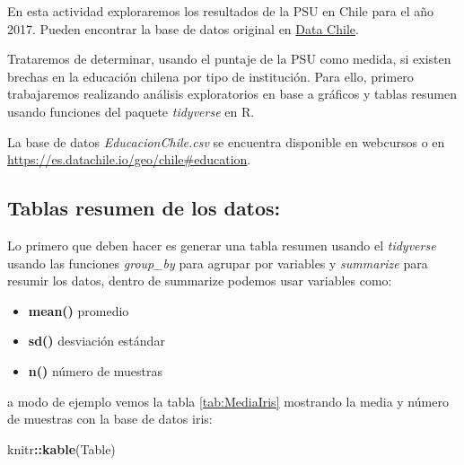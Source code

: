 \documentclass[]{book}
\newenvironment{Shaded}{\begin{snugshade}}{\end{snugshade}}
\newcommand{\KeywordTok}[1]{\textcolor[rgb]{0.13,0.29,0.53}{\textbf{#1}}}
\newcommand{\DataTypeTok}[1]{\textcolor[rgb]{0.13,0.29,0.53}{#1}}
\newcommand{\StringTok}[1]{\textcolor[rgb]{0.31,0.60,0.02}{#1}}
\newcommand{\OperatorTok}[1]{\textcolor[rgb]{0.81,0.36,0.00}{\textbf{#1}}}
\newcommand{\NormalTok}[1]{#1}
\providecommand{\tightlist}{%
  \setlength{\itemsep}{0pt}\setlength{\parskip}{0pt}}
\begin{document}
En esta actividad exploraremos los resultados de la PSU en Chile para el
año 2017. Pueden encontrar la base de datos original en
\href{https://es.datachile.io/geo/chile\#education}{Data Chile}.

Trataremos de determinar, usando el puntaje de la PSU como medida, si
existen brechas en la educación chilena por tipo de institución. Para
ello, primero trabajaremos realizando análisis exploratorios en base a
gráficos y tablas resumen usando funciones del paquete \emph{tidyverse}
\citep{WickhamTidy2017} en R.

La base de datos \emph{EducacionChile.csv} se encuentra disponible en
webcursos o en \url{https://es.datachile.io/geo/chile\#education}.

\subsection{Tablas resumen de los
datos:}\label{tablas-resumen-de-los-datos}

Lo primero que deben hacer es generar una tabla resumen usando el
\emph{tidyverse} usando las funciones \emph{group\_by} para agrupar por
variables y \emph{summarize} para resumir los datos, dentro de summarize
podemos usar variables como:

\begin{itemize}
\tightlist
\item
  \textbf{mean()} promedio
\item
  \textbf{sd()} desviación estándar
\item
  \textbf{n()} número de muestras
\end{itemize}

a modo de ejemplo vemos la tabla \ref{tab:MediaIris} mostrando la media
y número de muestras con la base de datos iris:

\begin{Shaded}
\end{Shaded}

\begin{Shaded}
\begin{Highlighting}[]
\NormalTok{knitr}\OperatorTok{::}\KeywordTok{kable}\NormalTok{(Table)}
\end{Highlighting}
\end{Shaded}
\end{document}
